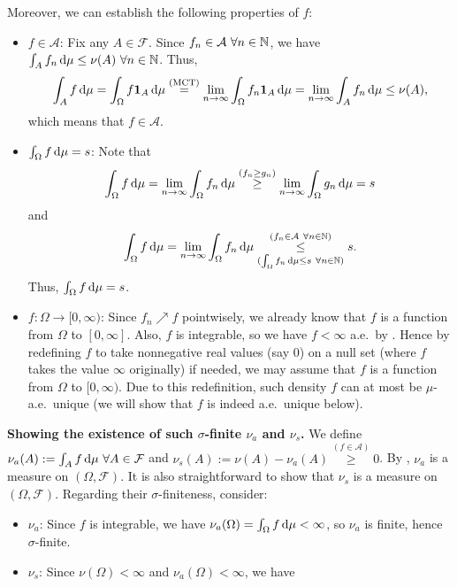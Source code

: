 \begin{enumerate}
\begin{pf}
Moreover, we can establish the following properties of \(f\):
\begin{itemize}
\item \underline{\(f\in \mathcal{A}\)}: Fix any \(A\in\mathcal{F}\). Since
\(f_n\in\mathcal{A}~\forall n\in\mathbb{N}\), we have
\(\int_{A}^{}f_n\odif{\mu}\le\nu(A)~\forall n\in\N\). Thus,
\[
\int_{A}^{}f\odif{\mu}=\int_{\Omega}^{}f\indic_{A}\odif{\mu}
\overset{\text{(MCT)}}{=}\lim_{n\to\infty}\int_{\Omega}^{}f_n\indic_{A}\odif{\mu}
=\lim_{n\to\infty}\int_{A}^{}f_n\odif{\mu}\le\nu(A),
\]
which means that \(f\in \mathcal{A}\).
\item \underline{\(\int_{\Omega}^{}f\odif{\mu}=s\)}: Note that
\[
\int_{\Omega}^{}f\odif{\mu}=\lim_{n\to\infty}\int_{\Omega}^{}f_n\odif{\mu}\overset{(f_n\ge
g_n)}{\ge}\lim_{n\to\infty}\int_{\Omega}^{}g_n\odif{\mu}=s
\]
and
\[
\int_{\Omega}^{}f\odif{\mu}=\lim_{n\to\infty}\int_{\Omega}^{}f_n\odif{\mu}
\underset{(\int_{\Omega}^{}f_n\odif{\mu}\le s~\forall n\in\N)}
{\overset{(f_n\in\mathcal{A}~\forall n\in\N)}{\le}}s.
\]
Thus, \(\int_{\Omega}^{}f\odif{\mu}=s\).
\item \underline{\(f:\Omega\to[0,\infty)\)}: Since \(f_n\nearrow f\)
pointwisely, we already know that \(f\) is a function from \(\Omega\) to
\([0,\infty]\).  Also, \(f\) is integrable, so we have \(f<\infty\) a.e.\ by
. Hence by redefining \(f\) to take nonnegative
real values (say \(0\)) on a null set (where \(f\) takes the value \(\infty\) originally)
if needed, we may assume that \(f\) is a function from \(\Omega\) to
\([0,\infty)\). Due to this redefinition, such density \(f\) can at most be
\(\mu\)-a.e.\ unique (we will show that \(f\) is indeed a.e.\ unique below).
\end{itemize}
\textbf{Showing the existence of such \(\sigma\)-finite \(\nu_a\) and \(\nu_s\).}
We define \(\nu_a(A):=\int_{A}^{}f\odif{\mu}~\forall A\in\mathcal{F}\) and
\(\nu_s(A):=\nu(A)-\nu_a(A)\overset{(f\in \mathcal{A})}{\ge}0\). By
, \(\nu_a\) is a measure on
\((\Omega,\mathcal{F})\). It is also straightforward to show that \(\nu_s\) is
a measure on \((\Omega,\mathcal{F})\). Regarding their \(\sigma\)-finiteness, consider:
\begin{itemize}
\item \(\nu_a\): Since \(f\) is integrable, we have
\(\nu_a(\Omega)=\int_{\Omega}^{}f\odif{\mu}<\infty\), so \(\nu_a\) is
finite, hence \(\sigma\)-finite.
\item \(\nu_s\): Since \(\nu(\Omega)<\infty\) and \(\nu_a(\Omega)<\infty\), we have

\end{itemize}
\end{pf}
\end{enumerate}
